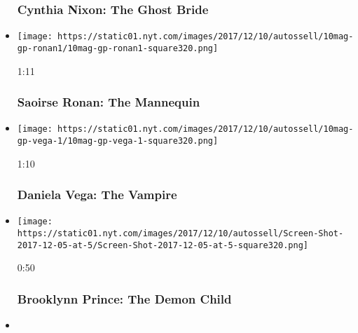 \begin{itemize}
{  \subsubsection{Cynthia Nixon: The Ghost
  Bride}\label{cynthia-nixon-the-ghost-bride}}
\item
  \href{https://www.nytimes.com/video/magazine/100000005588911/the-mannequin.html?action=click\&module=video-series-bar\&region=header\&pgtype=Article\&playlistId=video/magazine}{}

  \texttt{[image: https://static01.nyt.com/images/2017/12/10/autossell/10mag-gp-ronan1/10mag-gp-ronan1-square320.png]}

  1:11

  \hypertarget{saoirse-ronan-the-mannequin}{%
  \subsubsection{Saoirse Ronan: The
  Mannequin}\label{saoirse-ronan-the-mannequin}}
\item
  \href{https://www.nytimes.com/video/magazine/100000005588930/daniela-vega-the-vampire.html?action=click\&module=video-series-bar\&region=header\&pgtype=Article\&playlistId=video/magazine}{}

  \texttt{[image: https://static01.nyt.com/images/2017/12/10/autossell/10mag-gp-vega-1/10mag-gp-vega-1-square320.png]}

  1:10

  \hypertarget{daniela-vega-the-vampire}{%
  \subsubsection{Daniela Vega: The
  Vampire}\label{daniela-vega-the-vampire}}
\item
  \href{https://www.nytimes.com/video/magazine/100000005588908/brooklynn-prince-the-demon-child.html?action=click\&module=video-series-bar\&region=header\&pgtype=Article\&playlistId=video/magazine}{}

  \texttt{[image: https://static01.nyt.com/images/2017/12/10/autossell/Screen-Shot-2017-12-05-at-5/Screen-Shot-2017-12-05-at-5-square320.png]}

  0:50

  \hypertarget{brooklynn-prince-the-demon-child}{%
  \subsubsection{Brooklynn Prince: The Demon
  Child}\label{brooklynn-prince-the-demon-child}}
\item
  \href{https://www.nytimes.com/video/magazine/100000005588876/jake-gyllenhaal-the-damned.html?action=click\&module=video-series-bar\&region=header\&pgtype=Article\&playlistId=video/magazine}{}


\end{itemize}
